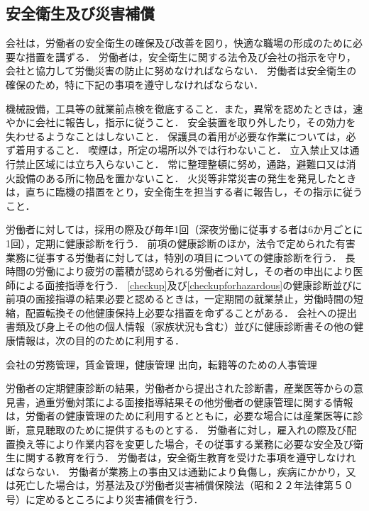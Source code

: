 \documentclass[11pt,a4paper]{jsarticle}
\begin{document}
\subsection{安全衛生及び災害補償}
会社は，労働者の安全衛生の確保及び改善を図り，快適な職場の形成のために必要な措置を講ずる．
\term
労働者は，安全衛生に関する法令及び会社の指示を守り，会社と協力して労働災害の防止に努めなければならない．
\term
労働者は安全衛生の確保のため，特に下記の事項を遵守しなければならない．
\begin{enumerate}
	\itm 機械設備，工具等の就業前点検を徹底すること．また，異常を認めたときは，速やかに会社に報告し，指示に従うこと．
	\itm 安全装置を取り外したり，その効力を失わせるようなことはしないこと．
	\itm 保護具の着用が必要な作業については，必ず着用すること．
	\itm 喫煙は，所定の場所以外では行わないこと．
	\itm 立入禁止又は通行禁止区域には立ち入らないこと．
	\itm 常に整理整頓に努め，通路，避難口又は消火設備のある所に物品を置かないこと．
	\itm 火災等非常災害の発生を発見したときは，直ちに臨機の措置をとり，安全衛生を担当する者に報告し，その指示に従うこと．
\end{enumerate}
労働者に対しては，採用の際及び毎年1回（深夜労働に従事する者は6か月ごとに1回），定期に健康診断を行う．
\label{checkup}
\term
 前項の健康診断のほか，法令で定められた有害業務に従事する労働者に対しては，特別の項目についての健康診断を行う．
\label{checkupforhazardous}
\term
長時間の労働により疲労の蓄積が認められる労働者に対し，その者の申出により医師による面接指導を行う．
\term
\ref{checkup}及び\ref{checkupforhazardous}の健康診断並びに前項の面接指導の結果必要と認めるときは，一定期間の就業禁止，労働時間の短縮，配置転換その他健康保持上必要な措置を命ずることがある．
会社への提出書類及び身上その他の個人情報（家族状況も含む）並びに健康診断書その他の健康情報は，次の目的のために利用する．
\begin{enumerate}
	\itm 会社の労務管理，賃金管理，健康管理
	\itm 出向，転籍等のための人事管理
\end{enumerate}
\term
労働者の定期健康診断の結果，労働者から提出された診断書，産業医等からの意見書，過重労働対策による面接指導結果その他労働者の健康管理に関する情報は，労働者の健康管理のために利用するとともに，必要な場合には産業医等に診断，意見聴取のために提供するものとする．
労働者に対し，雇入れの際及び配置換え等により作業内容を変更した場合，その従事する業務に必要な安全及び衛生に関する教育を行う．
\term
労働者は，安全衛生教育を受けた事項を遵守しなければならない．
労働者が業務上の事由又は通勤により負傷し，疾病にかかり，又は死亡した場合は，労基法及び労働者災害補償保険法（昭和２２年法律第５０号）に定めるところにより災害補償を行う．
\end{document}
